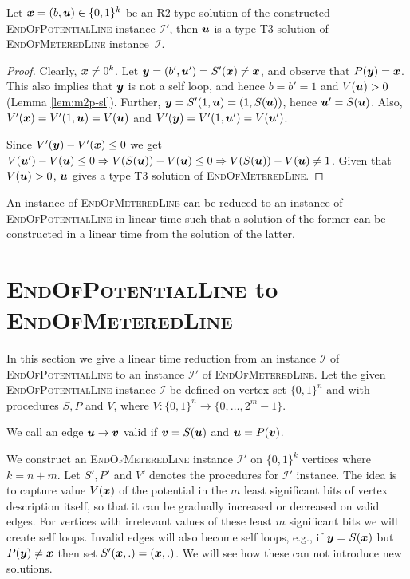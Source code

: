 \documentclass[a4paper,UKenglish]{lipics2}
\theoremstyle{definition}
\def\problem#1{\textsc{#1}}
\def\EOPL{\problem{EndOfPotentialLine}\xspace}
\def\EOML{\problem{EndOfMeteredLine}\xspace}
\newcommand{\CI}{\mbox{${\mathcal I}$}}
\newcommand{\yy}{\mbox{\boldmath $y$}}
\newcommand{\uu}{\mbox{\boldmath $u$}}
\newcommand{\vv}{\mbox{\boldmath $v$}}
\newcommand{\xx}{\mbox{\boldmath $x$}}
\begin{document}
\begin{lemma}\label{lem:m2p-r2}
Let $\xx=(b,\uu)\in \{0,1\}^k$ be an R2 type solution of the constructed \EOPL instance $\CI'$, then $\uu$ is a type T3 solution of \EOML instance~$\CI$.
\end{lemma}
\begin{proof}
Clearly, $\xx\neq 0^k$. Let $\yy = (b',\uu') = S'(\xx) \neq \xx$, and observe that $P(\yy) = \xx$. This also implies that $\yy$ is not a self loop, and hence $b=b'=1$ and $V(\uu)>0$ (Lemma \ref{lem:m2p-sl}). Further, $\yy = S'(1,\uu)=(1,S(\uu))$, hence $\uu'=S(\uu)$. Also, $V'(\xx)=V'(1,\uu)=V(\uu)$ and $V'(\yy)=V'(1,\uu')=V(\uu')$. 

Since $V'(\yy)-V'(\xx)\le 0$ we get $V(\uu')-V(\uu)\le 0 \Rightarrow V(S(\uu)) - V(\uu) \le 0\Rightarrow V(S(\uu)) - V(\uu)\neq 1$. Given that $V(\uu)>0$, $\uu$ gives a type T3 solution of \EOML.
\end{proof}

\begin{theorem}\label{thm:m2p}
An instance of \EOML can be reduced to an instance of \EOPL in linear time such that a solution of the former can be constructed in a linear time from the solution of the latter. 
\end{theorem}


\section{\EOPL to \EOML}
\label{sec:eopl2eoml}

In this section we give a linear time reduction from an instance $\CI$ of \EOPL to an instance $\CI'$ of \EOML. Let the given \EOPL instance $\CI$ be defined on vertex set $\{0,1\}^n$ and with procedures $S,P$ and $V$, where $V:\{0,1\}^n\rightarrow \{0,\dots,2^m-1\}$. 
\medskip

 We call an edge $\uu \rightarrow \vv$ valid if $\vv=S(\uu)$ and $\uu=P(\vv)$. 
\medskip

We construct an \EOML instance $\CI'$ on $\{0,1\}^k$ vertices where $k=n+m$. 
Let $S',P'$ and $V'$ denotes the procedures for $\CI'$ instance. 
The idea is to capture value $V(\xx)$ of the potential in the $m$ least significant bits of vertex description itself, so that it can be gradually increased or decreased on valid edges. For vertices with irrelevant values of these least $m$ significant bits we will create self loops. Invalid edges will also become self loops, e.g., if $\yy=S(\xx)$ but $P(\yy)\neq \xx$ then set $S'(\xx,.)=(\xx,.)$. We will see how these can not introduce new solutions. 
\end{document}
